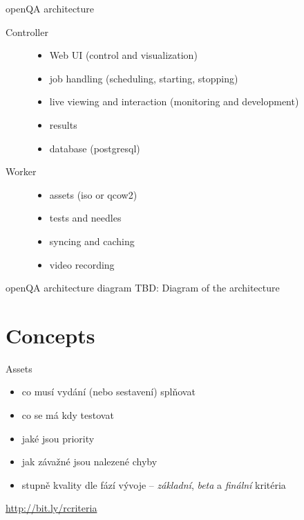 \documentclass[12pt,aspectratio=169]{beamer}
\begin{document}
\begin{frame}{openQA architecture}
	\begin{description}
		\item[Controller]
			\begin{itemize}
				\item Web UI (control and visualization)
				\item job handling (scheduling, starting, stopping)
				\item live viewing and interaction (monitoring and development)
				\item results
				\item database (postgresql)
			\end{itemize}
		\item[Worker]
			\begin{itemize}
				\item assets (iso or qcow2)
				\item tests and needles 
				\item syncing and caching 
				\item video recording
			\end{itemize}
	\end{description}
\end{frame}

\begin{frame}{openQA architecture diagram}
TBD: Diagram of the architecture
\end{frame}

\section{Concepts}

\begin{frame}{Assets}


	
	\begin{itemize}
		\item co musí vydání (nebo sestavení) splňovat
		\item co se má kdy testovat
		\item jaké jsou priority
		\item jak závažné jsou nalezené chyby
		\item stupně kvality dle fází vývoje -- \textit{základní}, \textit{beta} a \textit{finální} kritéria
	\end{itemize}
	
	\vspace{10pt}
	
	{\small \url{http://bit.ly/rcriteria}}
\end{frame}
\end{document}
